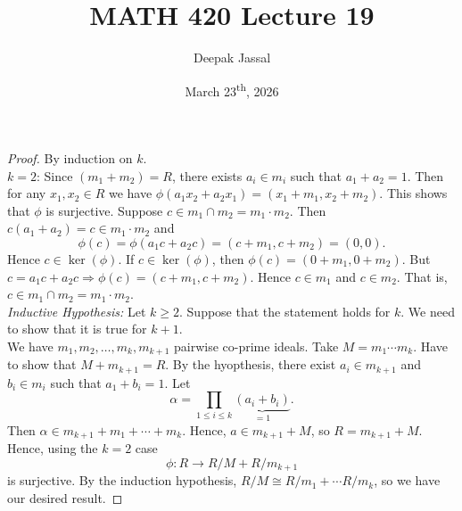 \documentclass[12pt]{article}
\title{MATH 420 Lecture 19}
\author{Deepak Jassal}
\date{March 23\textsuperscript{th}, 2026}
\begin{document}
\maketitle
{}
\begin{proof}
    By induction on $k$.\\
    $k=2$: Since $(m_1+m_2)=R$, there exists $a_i\in m_i$ such that $a_1+a_2=1$. Then for any $x_1,x_2\in R$ we have $\phi(a_1x_2+a_2x_1)=(x_1+m_1,x_2+m_2)$. This shows that $\phi$ is surjective.
    Suppose $c\in m_1\cap m_2=m_1\cdot m_2$. Then $c(a_1+a_2)=c\in m_1\cdot m_2$ and
    \[
        \phi(c)=\phi(a_1c+a_2c)=(c+m_1,c+m_2)=(0,0).
    \]
    Hence $c\in\ker(\phi)$. If $c\in\ker(\phi)$, then $\phi(c)=(0+m_1,0+m_2)$. But $c=a_1c+a_2c\Rightarrow\phi(c)=(c+m_1,c+m_2)$. Hence $c\in m_1$ and $c\in m_2$. That is, $c\in m_1\cap m_2=m_1\cdot m_2$.\\
    \textit{Inductive Hypothesis:} Let $k\geq2$. Suppose that the statement holds for $k$. We need to show that it is true for $k+1$.\\
    We have $m_1,m_2,\dots,m_k,m_{k+1}$ pairwise co-prime ideals. Take $M=m_1\cdots m_k$. Have to show that $M+m_{k+1}=R$. By the hyopthesis, there exist $a_i\in m_{k+1}$ and $b_i\in m_i$ such that $a_1+b_i=1$. Let
    \[
        \alpha=\prod_{1\leq i\leq k}\underbrace{(a_i+b_i)}_{=1}. 
    \]
    Then $\alpha\in m_{k+1}+m_1+\cdots+m_k$. Hence, $a\in m_{k+1}+M$, so $R=m_{k+1}+M$. Hence, using the $k=2$ case
    \[
        \phi:R\to R/M+R/m_{k+1}
    \]
    is surjective. By the induction hypothesis, $R/M\cong R/m_1+\cdots R/m_k$, so we have our desired result. 
\end{proof}
\end{document}
